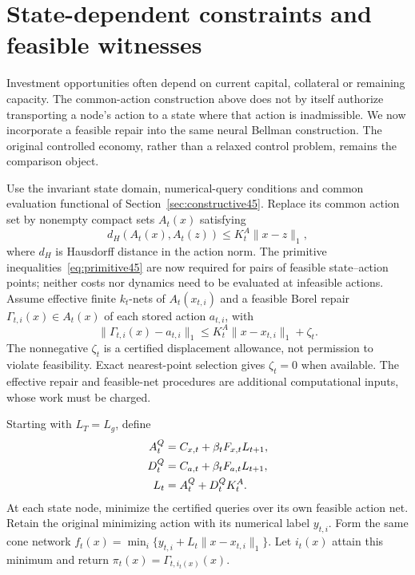 \section{State-dependent constraints and feasible witnesses}\label{sec:feasible46}
Investment opportunities often depend on current capital, collateral or remaining capacity. The common-action construction above does not by itself authorize transporting a node's action to a state where that action is inadmissible. We now incorporate a feasible repair into the same neural Bellman construction. The original controlled economy, rather than a relaxed control problem, remains the comparison object.

Use the invariant state domain, numerical-query conditions and common evaluation functional of Section~\ref{sec:constructive45}. Replace its common action set by nonempty compact sets $A_t(x)$ satisfying
\begin{equation}\label{eq:hausdorff46}
 d_H(A_t(x),A_t(z))\le K_t^A\|x-z\|_1,
\end{equation}
where $d_H$ is Hausdorff distance in the action norm. The primitive inequalities~\eqref{eq:primitive45} are now required for pairs of feasible state--action points; neither costs nor dynamics need to be evaluated at infeasible actions. Assume effective finite $k_t$-nets of $A_t(x_{t,i})$ and a feasible Borel repair $\Gamma_{t,i}(x)\in A_t(x)$ of each stored action $a_{t,i}$, with
\begin{equation}\label{eq:repair46}
 \|\Gamma_{t,i}(x)-a_{t,i}\|_1
 \le K_t^A\|x-x_{t,i}\|_1+\zeta_t.
\end{equation}
The nonnegative $\zeta_t$ is a certified displacement allowance, not permission to violate feasibility. Exact nearest-point selection gives $\zeta_t=0$ when available. The effective repair and feasible-net procedures are additional computational inputs, whose work must be charged.

Starting with $L_T=L_g$, define
\begin{align}\label{eq:graphmod46}
 A_t^Q&=C_{x,t}+\beta_tF_{x,t}L_{t+1},\\
 D_t^Q&=C_{a,t}+\beta_tF_{a,t}L_{t+1},\\
 L_t&=A_t^Q+D_t^QK_t^A.\notag
\end{align}
At each state node, minimize the certified queries over its own feasible action net. Retain the original minimizing action with its numerical label $y_{t,i}$. Form the same cone network $f_t(x)=\min_i\{y_{t,i}+L_t\|x-x_{t,i}\|_1\}$. Let $i_t(x)$ attain this minimum and return $\pi_t(x)=\Gamma_{t,i_t(x)}(x)$.

